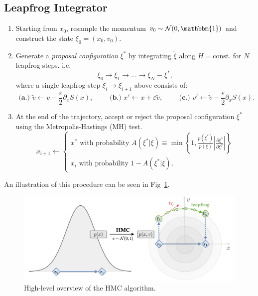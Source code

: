 \documentclass[a4paper,11pt]{article}
\newcommand{\acceptProb}{%
            A(\xi^{\ast}|\xi) \equiv \min\left\{1,
            \frac{p(\xi^{\ast})}{p(\xi)}%
        \left|\frac{\partial \xi^{\ast}}{\partial \xi^{T}}\right|\right\}
    }
\begin{document}
\subsection{\label{subsec:lfint}Leapfrog Integrator}
%
\begin{enumerate}
    \item Starting from \(x_{0}\), resample the momentum \(v_{0}\sim
        \mathcal{N} (0, \mathbbm{1})\) and construct the state \(\xi_{0} =
        (x_{0}, v_{0})\).
    \item Generate a \emph{proposal configuration} \(\xi^{\ast}\) by
        integrating \(\dot\xi\) along \(H = \mathrm{const.}\)
        for \(N\) leapfrog steps.
        i.e.
        \begin{equation}
            \xi_{0}\rightarrow \xi_{1}\rightarrow\ldots\rightarrow
            \xi_{N} \equiv \xi^{\ast},
        \end{equation}
        where a single leapfrog step \(\xi_{i} \rightarrow \xi_{i+1}\) above
        consists of: 
        \begin{equation}
            \textbf{ (a.) }%
              \tilde{v}\leftarrow v - \frac{\varepsilon}{2}\partial_{x} S(x),
            \quad\quad
            \textbf{ (b.) }%
              x' \leftarrow x + \varepsilon \tilde{v},
            \quad\quad
            \textbf{ (c.) }%
              v' \leftarrow \tilde{v} - \frac{\varepsilon}{2}\partial_{x} S(x).
        \end{equation}
    \item At the end of the trajectory, accept or reject the proposal
        configuration \(\xi^{\ast}\) using the Metropolis-Hastings (MH) test.
        \begin{equation}
            x_{i+1} \leftarrow
            \begin{cases}
                x^{\ast}\text{ with probability } \acceptProb \\
                x_{i}\text{ with probability } 1 - A(\xi^{\ast}|\xi),
            \end{cases}
        \end{equation}
\end{enumerate}
%
An illustration of this procedure can be seen in Fig~\ref{fig:hmc}.
%
\begin{figure}[htpb]
    \centering
    \includegraphics[width=\textwidth]{assets/hmc.pdf}
    \caption{\label{fig:hmc}High-level overview of the HMC algorithm.}
\end{figure}
%
\end{document}
